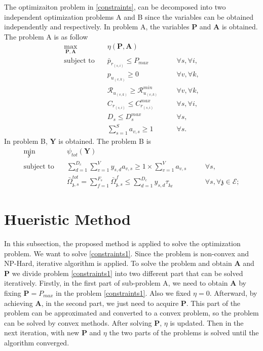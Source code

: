 \documentclass[conference]{IEEEtran}
\begin{document}
The optimizaiton problem in \eqref{constraints}, can be decomposed into two independent optimization problems A and B since the variables can be obtained independently and respectively. In problem A,
the variables $\boldsymbol{P}$ and $ \boldsymbol{A}$ is obtained. The problem A is as follow
\begin{subequations}
\begin{alignat}{4}
\max\limits_{\boldsymbol{P}, \boldsymbol{A} }   \quad &   \eta(\boldsymbol{P},\boldsymbol{A})\\
\text{subject to} \quad  & \bar{p}_{r_{(s,i)}} \leq P_{max} && \quad \forall s, \forall i,   \\
&p_{u_{(v,k)}}  \geq 0  &&\quad \forall v, \forall k, \\
&\mathcal{R}_{u_{(v,k)}} \geq  \mathcal{R}_{u_{(v,k)}}^{min} && \quad \forall v, \forall k, \\
&C_{r_{(s,i)}} \leq C_{r_{(s,i)}}^{max}  &&\quad \forall s, \forall i,\label{cc14} \\
&D_{s} \leq D_{s}^{max}  &&\quad \forall s, \label{cc15} \\
& \sum_{s=1}^{S}a_{v,s} \geq 1 &&\quad \forall s.
\end{alignat}
\label{constraints1}
\end{subequations}
In problem B, $ \boldsymbol{Y}$ is obtained. The problem B is
\begin{subequations}
\begin{alignat}{4}
\min\limits_{\boldsymbol{y} }   \quad &   \psi_{tot}(\boldsymbol{Y})\\
\text{subject to} \quad & \sum_{d=1}^{D_c}\sum_{v=1}^{V}y_{s,d}a_{v,s} \geq 1\times\sum_{v=1}^{V}a_{v,s} &&\quad \forall s, \\
 &\bar{\Omega}_{\mathfrak{z},s}^{tot} = \sum_{f=1}^{F_s}\bar{\Omega}_{\mathfrak{z},s}^f \leq  \sum_{d=1}^{D_c} y_{s,d} \tau_{\mathfrak{z}_d}
 && \quad  \forall s, \forall \mathfrak{z}\in \mathcal{E};  \label{eqomega}
\end{alignat}
\label{constraints2}
\end{subequations}
\section{Hueristic Method}\label{proposedmethod}
In this subsection, the proposed method is applied to solve the optimization problem.
We want to solve \eqref{constraints1}. Since the problem is non-convex and NP-Hard, iterative algorithm is applied.
To solve the problem and obtain $\boldsymbol{A}$ and $\boldsymbol{P}$ we divide problem \eqref{constraints1} into
two different part that can be solved iteratively.
Firstly, in the first part of sub-problem A, we need to obtain $\boldsymbol{A}$ by fixing $\boldsymbol{P} = P_{max}$ in the problem \eqref{constraints1}. Also we fixed $\eta = 0$. Afterward, by achieving $\boldsymbol{A}$, in the second part, we just need to acquire $\boldsymbol{P}$. This part of the problem can be approximated and converted to a convex problem, so the problem can be solved by convex methods. After solving $\boldsymbol{P}$, $\eta$ is updated. Then in the next iteration, with new $\boldsymbol{P}$
and $\eta$ the two parts of the problems is solved until the algorithm converged.
\end{document}
